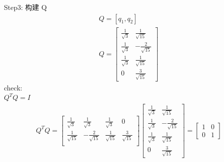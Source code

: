 \documentclass[12pt]{article}
\begin{document}
\begin{flushleft}
    Step3: 构建 Q \\
    \begin{align}
        Q = [q_{1}, q_{2}] \\
        Q  = \begin{bmatrix}
                 \frac{1}{\sqrt{3}} & \frac{1}{\sqrt{15}}  \\
                 \frac{1}{\sqrt{3}} & -\frac{2}{\sqrt{15}} \\
                 \frac{1}{\sqrt{3}} & \frac{1}{\sqrt{15}}  \\
                 0                  & \frac{3}{\sqrt{15}}
             \end{bmatrix}
    \end{align}
    check: \\
    $Q^{T}Q = I$ \\
    \begin{align}
        Q^{T}Q = \begin{bmatrix}
                     \frac{1}{\sqrt{3}}  & \frac{1}{\sqrt{3}}   & \frac{1}{\sqrt{3}}  & 0                   \\
                     \frac{1}{\sqrt{15}} & -\frac{2}{\sqrt{15}} & \frac{1}{\sqrt{15}} & \frac{3}{\sqrt{15}} \\
                 \end{bmatrix}\begin{bmatrix}
                                  \frac{1}{\sqrt{3}} & \frac{1}{\sqrt{15}}  \\
                                  \frac{1}{\sqrt{3}} & -\frac{2}{\sqrt{15}} \\
                                  \frac{1}{\sqrt{3}} & \frac{1}{\sqrt{15}}  \\
                                  0                  & \frac{3}{\sqrt{15}}
                              \end{bmatrix}
        = \begin{bmatrix}
              1 & 0 \\
              0 & 1
          \end{bmatrix}
    \end{align}


\end{flushleft}
\end{document}
